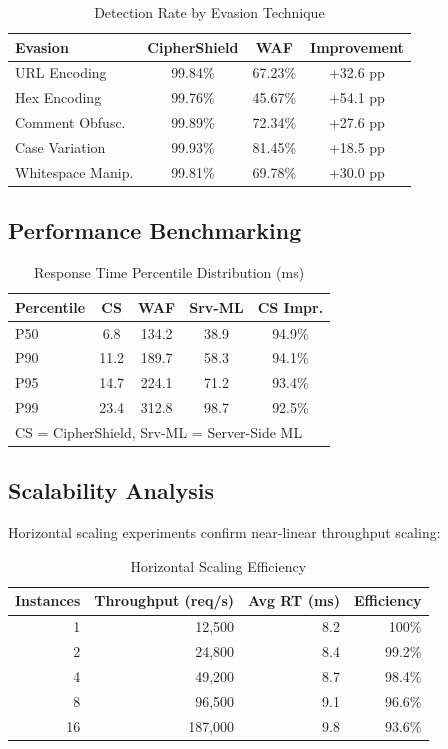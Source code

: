 \documentclass[10pt, twocolumn]{article}
\begin{document}
\begin{table}[H]
\centering
\caption{Detection Rate by Evasion Technique}
\label{tab:evasion}
\small
\begin{tabular}{lccc}
\toprule
\textbf{Evasion} & \textbf{CipherShield} & \textbf{WAF} & \textbf{Improvement} \\
\midrule
URL Encoding     & 99.84\% & 67.23\% & +32.6 pp \\
Hex Encoding     & 99.76\% & 45.67\% & +54.1 pp \\
Comment Obfusc.  & 99.89\% & 72.34\% & +27.6 pp \\
Case Variation   & 99.93\% & 81.45\% & +18.5 pp \\
Whitespace Manip.& 99.81\% & 69.78\% & +30.0 pp \\
\bottomrule
\end{tabular}
\end{table}

\subsection{Performance Benchmarking}

\begin{table}[H]
\centering
\caption{Response Time Percentile Distribution (ms)}
\label{tab:perf}
\small
\begin{tabular}{lcccc}
\toprule
\textbf{Percentile} & \textbf{CS} & \textbf{WAF} & \textbf{Srv-ML} & \textbf{CS Impr.} \\
\midrule
P50  &  6.8 & 134.2 & 38.9 & 94.9\% \\
P90  & 11.2 & 189.7 & 58.3 & 94.1\% \\
P95  & 14.7 & 224.1 & 71.2 & 93.4\% \\
P99  & 23.4 & 312.8 & 98.7 & 92.5\% \\
\bottomrule
\multicolumn{5}{l}{\footnotesize CS = CipherShield, Srv-ML = Server-Side ML}
\end{tabular}
\end{table}

\subsection{Scalability Analysis}

Horizontal scaling experiments confirm near-linear throughput scaling:

\begin{table}[H]
\centering
\caption{Horizontal Scaling Efficiency}
\label{tab:scale}
\small
\begin{tabular}{rrrr}
\toprule
\textbf{Instances} & \textbf{Throughput (req/s)} & \textbf{Avg RT (ms)} & \textbf{Efficiency} \\
\midrule
 1 &  12,500 & 8.2 & 100\%  \\
 2 &  24,800 & 8.4 & 99.2\% \\
 4 &  49,200 & 8.7 & 98.4\% \\
 8 &  96,500 & 9.1 & 96.6\% \\
16 & 187,000 & 9.8 & 93.6\% \\
\bottomrule
\end{tabular}
\end{table}
\end{document}
